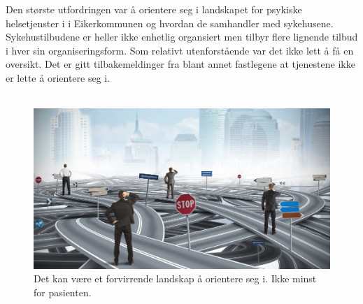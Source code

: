 \documentclass[11pt]{report} %
\begin{document}
                    Den største utfordringen var å orientere seg i landskapet for psykiske helsetjenster i i Eikerkommunen og hvordan de samhandler med sykehusene. Sykehustilbudene er heller ikke enhetlig organsiert men tilbyr flere lignende tilbud i hver sin organiseringsform. Som relativt utenforstående var det ikke lett å få en oversikt. Det er gitt tilbakemeldinger fra blant annet fastlegene at tjenestene ikke er lette å orientere seg i. \\ 
                    \\
                    \begin{figure}[ht]
                      \centering
                      \includegraphics{./pix/kaotiskvei.jpg}%
                      \caption[Framstilling av tjenestetilbudene]%
                      {Det kan være et forvirrende landskap å orientere seg i. Ikke minst for pasienten.}
                    \end{figure}    
\end{document}
